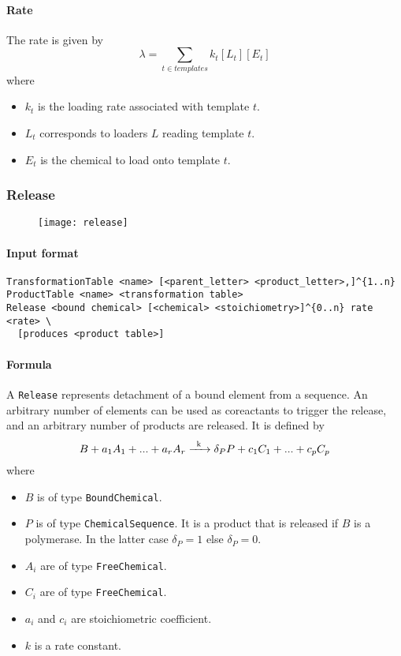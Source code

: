 \paragraph{Rate} The rate is given by
$$
	\lambda = \sum_{t\in templates} k_t[L_t][E_t]
$$
where
\begin{itemize}
	\item $k_t$ is the loading rate associated with template $t$.
	\item $L_t$ corresponds to loaders $L$ reading template $t$.
	\item $E_t$ is the chemical to load onto template $t$.
\end{itemize}

\subsubsection{Release}

\begin{figure}[!ht]
	\centering
	\texttt{[image: release]}
\end{figure}

\paragraph{Input format}
\begin{verbatim}
TransformationTable <name> [<parent_letter> <product_letter>,]^{1..n}
ProductTable <name> <transformation table>
Release <bound chemical> [<chemical> <stoichiometry>]^{0..n} rate <rate> \
  [produces <product table>]
\end{verbatim}

\paragraph{Formula} A \texttt{Release} represents detachment of a bound element from a sequence. An arbitrary number of elements can be used as coreactants to trigger the release, and an arbitrary number of products are released. It is defined by
$$
	\reactionIrr{B + a_1 A_1 + ... + a_r A_r}{\delta_PP + c_1 C_1 + ... + c_p C_p }{k}{}
$$
where
\begin{itemize}
	\item $B$ is of type \texttt{BoundChemical}.
	\item $P$ is of type \texttt{ChemicalSequence}. It is a product that is released if $B$ is a polymerase. In the latter case $\delta_P = 1$ else $\delta_P = 0$.
	\item $A_i$ are of type \texttt{FreeChemical}.
	\item $C_i$ are of type \texttt{FreeChemical}.
	\item $a_i$ and $c_i$ are stoichiometric coefficient.
	\item $k$ is a rate constant.
\end{itemize}

